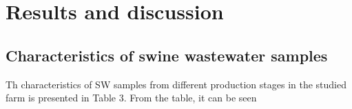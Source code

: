 \section{Results and discussion}
\subsection{Characteristics of swine wastewater samples}
Th characteristics of SW samples from different production stages in the studied farm is presented in Table 3. From the table, it can be seen 